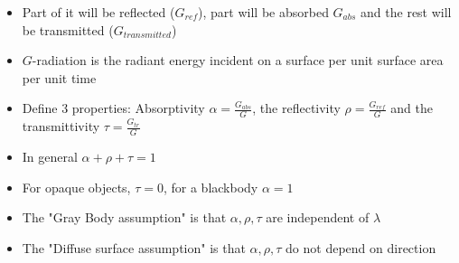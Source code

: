 \documentclass[12pt]{article}
\begin{document}
\begin{itemize}
\begin{itemize}
        \item Part of it will be reflected ($G_{ref}$), part will be absorbed $G_{abs}$ and the rest will be transmitted ($G_{transmitted}$)
        \item $G$-radiation is the radiant energy incident on a surface per unit surface area per unit time 
        \item Define 3 properties: Absorptivity $\alpha = \frac{G_{abs}}{G}$, the reflectivity $\rho = \frac{G_{ref}}{G}$ and the transmittivity $\tau = \frac{G_{tr}}{G}$
        \item In general $\alpha + \rho + \tau = 1$
        \item For opaque objects, $\tau = 0$, for a blackbody $\alpha = 1$
        \item The "Gray Body assumption" is that $\alpha, \rho, \tau$ are independent of $\lambda$
        \item The "Diffuse surface assumption" is that $\alpha, \rho, \tau$ do not depend on direction 
    \end{itemize}
    
\end{itemize}
\end{document}
